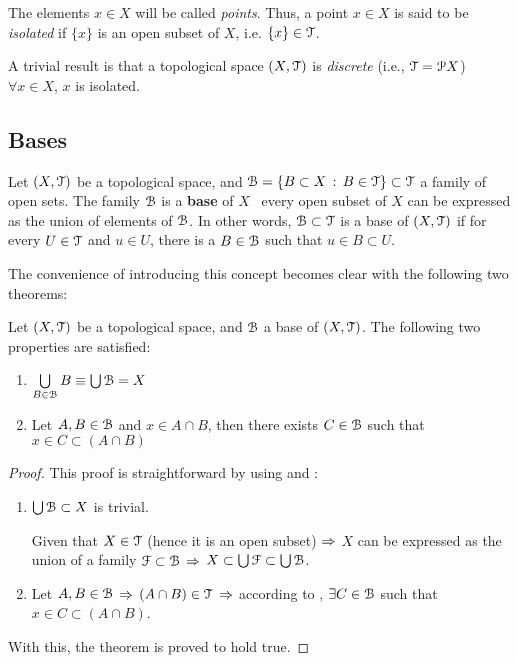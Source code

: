 \begin{definition}
The elements $x\in X$ will be called \emph{points}. Thus, a point $x\in X$ is said to be \emph{isolated} if $\{x\}$ is an open subset of $X$, i.e. $\{x\}\in \EuScript{T}$. 
\end{definition} 

\begin{remark} 
A trivial result is that a topological space $(X,\EuScript{T})$ is \emph{discrete} (i.e., $\EuScript{T}=\EuScript{P} X$) \iff\ $\forall x\in X$, $x$ is isolated.
\end{remark}

\subsection{Bases}

\begin{definition}
Let $(X, \EuScript{T})$ be a topological space, and $\EuScript{B} = \{B \subset X\,:\, B \in \EuScript{T}\}\subset\EuScript{T}$ a family of open sets. The family $\EuScript{B}$ is a \textbf{base} of $X$ \iff\, every open subset of $X$ can be expressed as the union of elements of $\EuScript{B}$. In other words, $\EuScript{B}\subset\EuScript{T}$ is a base of $(X,\EuScript{T})$ if for every $U\in\EuScript{T}$ and $u\in U$, there is a $B\in \EuScript{B}$ such that $u\in B\subset U$.
\label{def:base}
\end{definition}

The convenience of introducing this concept becomes clear with the following two theorems:

\begin{theorem}
Let $(X, \EuScript{T})$ be a topological space, and $\EuScript{B}$ a base of $(X, \EuScript{T})$.  The following two properties are satisfied: 
\begin{enumerate}
\item $\bigcup\limits_{B\in\EuScript{B}} B \equiv \bigcup\EuScript{B} = X$
\item Let $A, B\in \EuScript{B}$ and $x\in A\cap B$, then there exists $C\in \EuScript{B}$ such that $x\in C\subset (A\cap B)$
\end{enumerate}
\end{theorem}

\begin{proof} 
This proof is straightforward by using  and :
\begin{enumerate}
\item \noindent{$\boxed{\Rightarrow}$}  $\bigcup\EuScript{B} \subset X$ is trivial.

\noindent{$\boxed{\Leftarrow}$} Given that $X\in \EuScript{T}$ (hence it is an open subset) $\Rightarrow$ $X$ can be expressed as the union of a family $\EuScript{F}\subset \EuScript{B}$ $\Rightarrow$ $X \subset \bigcup \EuScript{F}\subset \bigcup \EuScript{B}$.

\item Let $A, B\in \EuScript{B}$ $\Rightarrow$ $(A\cap B)\in \EuScript{T}$ $\Rightarrow$ according to , $\exists C\in \EuScript{B}$ such that $x\in C\subset(A\cap B)$.
\end{enumerate}
With this, the theorem is proved to hold true. 
\end{proof}

